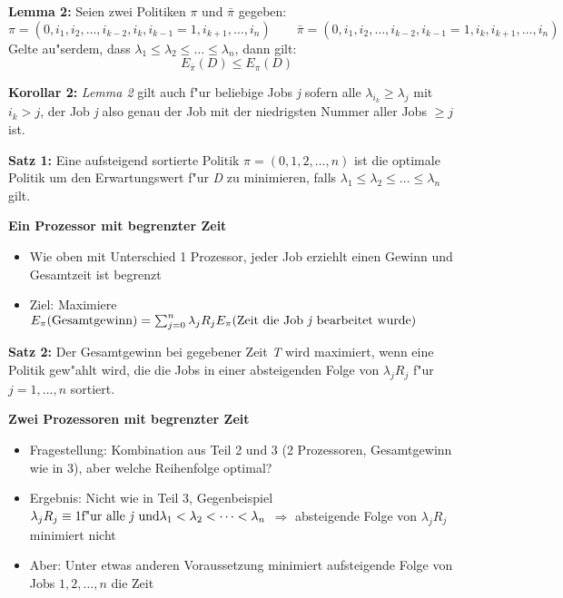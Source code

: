 \documentclass[a4paper]{report}
\begin{document}
\textbf{Lemma 2:} Seien zwei Politiken \(\pi\) und \(\bar \pi\) gegeben:
\begin{displaymath}\pi = (0, i_{1}, i_{2},\ldots, i_{k-2}, i_{k}, i_{k-1}=1, i_{k+1},\ldots, i_{n}) \qquad \bar\pi  = (0,i_{1},i_{2},\ldots,i_{k-2},i_{k-1}=1,i_{k},i_{k+1},\ldots,i_{n})\end{displaymath}
Gelte au"serdem, dass \(\lambda_{1} \le \lambda_{2} \le \ldots \le \lambda_{n}\), dann gilt:
\begin{displaymath}E_{\bar \pi}(D)\le E_{\pi}(D)\end{displaymath}


\textbf{Korollar 2:} \emph{Lemma 2} gilt auch f"ur beliebige Jobs \emph{j} sofern alle \(\lambda_{i_{k}} \ge \lambda_{j}\) mit \(i_{k} > j\), der Job \emph{j} also genau der Job mit der niedrigsten Nummer aller Jobs \( \ge j\) ist.


\textbf{Satz 1:} Eine aufsteigend sortierte Politik \(\pi = (0,1,2,\ldots,n)\) ist die optimale Politik um den Erwartungswert f"ur \emph{D} zu minimieren, falls \(\lambda_{1} \le \lambda_{2} \le \ldots \le \lambda_{n}\) gilt.


\textbf{Ein Prozessor mit begrenzter Zeit}

\begin{itemize}
\item Wie oben mit Unterschied 1 Prozessor, jeder Job erziehlt einen Gewinn und Gesamtzeit ist begrenzt
\item Ziel: Maximiere \(E_{\pi} (\textnormal{Gesamtgewinn}) = \sum_{j=0}^{n} \lambda_{j} R_{j} E_{\pi}(\textnormal{Zeit die Job \emph{j} bearbeitet wurde})\)
\end{itemize}


\textbf{Satz 2:} Der Gesamtgewinn bei gegebener Zeit \emph{T} wird maximiert, wenn eine Politik gew"ahlt wird, die die Jobs in einer absteigenden Folge von \(\lambda_{j} R_{j}\) f"ur \(j=1,\ldots,n\) sortiert.


\textbf{Zwei Prozessoren mit begrenzter Zeit}
\begin{itemize}
\item Fragestellung: Kombination aus Teil 2 und 3 (2 Prozessoren, Gesamtgewinn wie in 3), aber welche Reihenfolge optimal?
\item Ergebnis: Nicht wie in Teil 3, Gegenbeispiel \(\lambda_{j}R_{j} \equiv 1 \textnormal{f"ur alle \emph{j} und} \lambda_{1} < \lambda_{2} < \cdots < \lambda_{n}\) \(\Rightarrow\) absteigende Folge von \(\lambda_{j}R_{j}\) minimiert nicht
\item Aber: Unter etwas anderen Voraussetzung minimiert aufsteigende Folge von Jobs \(1, 2, \ldots, n\) die Zeit
\end{itemize}
\end{document}
